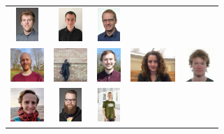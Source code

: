 \documentclass[usenames,dvipsnames,aspectratio=169,12pt]{beamer}
\begin{document}
\begin{frame}
\begin{figure}
\begin{tabular}{ccccc}
    {\includegraphics[height = 0.5in]{kristoffer.jpg}} &
    {\includegraphics[height = 0.5in]{johan.jpg}}      &
    {\includegraphics[height = 0.5in]{martin.jpg}}    \\
    {\includegraphics[height = 0.5in]{jeppe.png}}      &
    {\includegraphics[height = 0.5in]{aina.jpg}}       &
    {\includegraphics[height = 0.5in]{jakob.png}}      &
    {\includegraphics[height = 0.5in]{marit.png}}      &
    {\includegraphics[height = 0.5in]{mathias.jpg}}   \\
    {\includegraphics[height = 0.5in]{simon.jpg}}      &
    {\includegraphics[height = 0.5in]{lau.jpg}}        &
    {\includegraphics[height = 0.5in]{soeren.jpg}}     &

\end{tabular}
\end{figure}
\end{frame}
\end{document}
